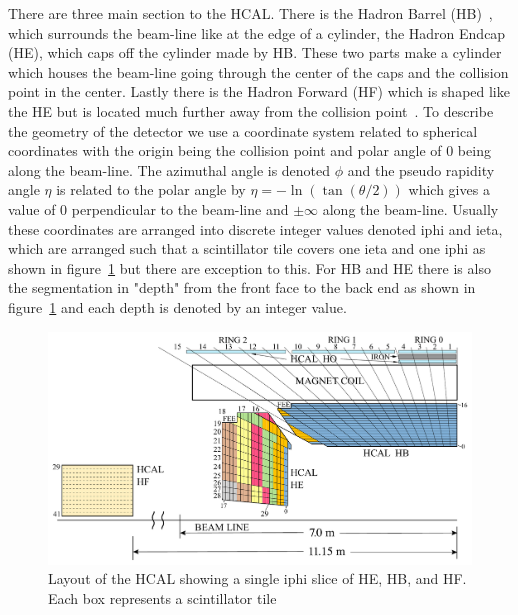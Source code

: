 There are three main section to the HCAL. There is the Hadron Barrel (HB)~\cite{HB}, which surrounds the beam-line like at the edge of a cylinder, the Hadron Endcap (HE), which caps off the cylinder made by HB. These two parts make a cylinder which houses the beam-line going through the center of the caps and the collision point in the center. Lastly there is the Hadron Forward (HF) which is shaped like the HE but is located much further away from the collision point~\cite{HF}. To describe the geometry of the detector we use a coordinate system related to spherical coordinates with the origin being the collision point and polar angle of 0 being along the beam-line. The azimuthal angle is denoted $\phi$ and the pseudo rapidity angle $\eta$ is related to the polar angle by $\eta = -\ln(\tan(\theta/2))$ which gives a value of 0 perpendicular to the beam-line and $\pm\infty$ along the beam-line. Usually these coordinates are arranged into discrete integer values denoted iphi and ieta, which are arranged such that a scintillator tile covers one ieta and one iphi as shown in figure~\ref{fig:Depth} but there are exception to this. For HB and HE there is also the segmentation in "depth" from the front face to the back end as shown in figure~\ref{fig:Depth} and each depth is denoted by an integer value. 


\begin{figure}
\centering
\includegraphics[width=\linewidth]{Figures/Depthsegmentation.pdf}
\caption{Layout of the HCAL showing a single iphi slice of HE, HB, and HF. Each box represents a scintillator tile}
\label{fig:Depth}
\end{figure}

